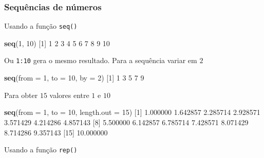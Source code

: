 \documentclass[10pt,a4paper]{book}
\newenvironment{Shaded}{\begin{snugshade}}{\end{snugshade}}
\newcommand{\KeywordTok}[1]{\textcolor[rgb]{0.13,0.29,0.53}{\textbf{#1}}}
\newcommand{\DataTypeTok}[1]{\textcolor[rgb]{0.13,0.29,0.53}{#1}}
\newcommand{\DecValTok}[1]{\textcolor[rgb]{0.00,0.00,0.81}{#1}}
\newcommand{\FloatTok}[1]{\textcolor[rgb]{0.00,0.00,0.81}{#1}}
\newcommand{\NormalTok}[1]{#1}
\begin{document}
\subsubsection{Sequências de números}\label{sequuxeancias-de-nuxfameros}

Usando a função \texttt{seq()}

\begin{Shaded}
\begin{Highlighting}[]
\KeywordTok{seq}\NormalTok{(}\DecValTok{1}\NormalTok{, }\DecValTok{10}\NormalTok{)}
\NormalTok{ [}\DecValTok{1}\NormalTok{]  }\DecValTok{1}  \DecValTok{2}  \DecValTok{3}  \DecValTok{4}  \DecValTok{5}  \DecValTok{6}  \DecValTok{7}  \DecValTok{8}  \DecValTok{9} \DecValTok{10}
\end{Highlighting}
\end{Shaded}

Ou \texttt{1:10} gera o mesmo resultado. Para a sequência variar em
\(2\)

\begin{Shaded}
\begin{Highlighting}[]
\KeywordTok{seq}\NormalTok{(}\DataTypeTok{from =} \DecValTok{1}\NormalTok{, }\DataTypeTok{to =} \DecValTok{10}\NormalTok{, }\DataTypeTok{by =} \DecValTok{2}\NormalTok{)}
\NormalTok{[}\DecValTok{1}\NormalTok{] }\DecValTok{1} \DecValTok{3} \DecValTok{5} \DecValTok{7} \DecValTok{9}
\end{Highlighting}
\end{Shaded}

Para obter \(15\) valores entre \(1\) e \(10\)

\begin{Shaded}
\begin{Highlighting}[]
\KeywordTok{seq}\NormalTok{(}\DataTypeTok{from =} \DecValTok{1}\NormalTok{, }\DataTypeTok{to =} \DecValTok{10}\NormalTok{, }\DataTypeTok{length.out =} \DecValTok{15}\NormalTok{)}
\NormalTok{ [}\DecValTok{1}\NormalTok{]  }\FloatTok{1.000000}  \FloatTok{1.642857}  \FloatTok{2.285714}  \FloatTok{2.928571}  \FloatTok{3.571429}  \FloatTok{4.214286}  \FloatTok{4.857143}
\NormalTok{ [}\DecValTok{8}\NormalTok{]  }\FloatTok{5.500000}  \FloatTok{6.142857}  \FloatTok{6.785714}  \FloatTok{7.428571}  \FloatTok{8.071429}  \FloatTok{8.714286}  \FloatTok{9.357143}
\NormalTok{[}\DecValTok{15}\NormalTok{] }\FloatTok{10.000000}
\end{Highlighting}
\end{Shaded}

Usando a função \texttt{rep()}
\end{document}
